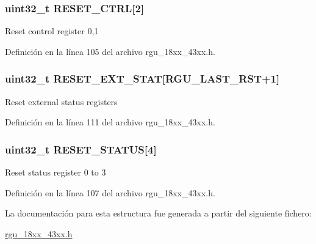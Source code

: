 \subsubsection[{\texorpdfstring{R\+E\+S\+E\+T\+\_\+\+C\+T\+RL}{RESET_CTRL}}]{ uint32\+\_\+t R\+E\+S\+E\+T\+\_\+\+C\+T\+RL\mbox{[}2\mbox{]}}\hypertarget{struct_l_p_c___r_g_u___t_a934d7cc5bb269f45b14d7fd4761d2f46}{}\label{struct_l_p_c___r_g_u___t_a934d7cc5bb269f45b14d7fd4761d2f46}
Reset control register 0,1 

Definición en la línea 105 del archivo rgu\+\_\+18xx\+\_\+43xx.\+h.

\subsubsection[{\texorpdfstring{R\+E\+S\+E\+T\+\_\+\+E\+X\+T\+\_\+\+S\+T\+AT}{RESET_EXT_STAT}}]{ uint32\+\_\+t R\+E\+S\+E\+T\+\_\+\+E\+X\+T\+\_\+\+S\+T\+AT\mbox{[}{\bf R\+G\+U\+\_\+\+L\+A\+S\+T\+\_\+\+R\+ST}+1\mbox{]}}\hypertarget{struct_l_p_c___r_g_u___t_a29b838d12b115f054028a29a177a3466}{}\label{struct_l_p_c___r_g_u___t_a29b838d12b115f054028a29a177a3466}
Reset external status registers 

Definición en la línea 111 del archivo rgu\+\_\+18xx\+\_\+43xx.\+h.

\subsubsection[{\texorpdfstring{R\+E\+S\+E\+T\+\_\+\+S\+T\+A\+T\+US}{RESET_STATUS}}]{ uint32\+\_\+t R\+E\+S\+E\+T\+\_\+\+S\+T\+A\+T\+US\mbox{[}4\mbox{]}}\hypertarget{struct_l_p_c___r_g_u___t_a046d33055aea08e80d1bbfbbab9b43e6}{}\label{struct_l_p_c___r_g_u___t_a046d33055aea08e80d1bbfbbab9b43e6}
Reset status register 0 to 3 

Definición en la línea 107 del archivo rgu\+\_\+18xx\+\_\+43xx.\+h.



La documentación para esta estructura fue generada a partir del siguiente fichero\+:\begin{DoxyCompactItemize}
\item 
\hyperlink{rgu__18xx__43xx_8h}{rgu\+\_\+18xx\+\_\+43xx.\+h}\end{DoxyCompactItemize}
